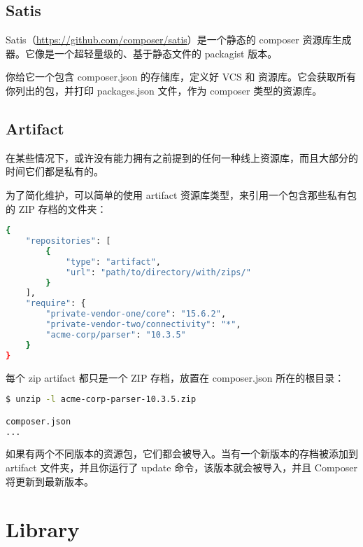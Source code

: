 \begin{lstlisting}[language=bash]

\end{lstlisting}

\subsection{Satis}

Satis（\url{https://github.com/composer/satis}）是一个静态的 composer 资源库生成器。它像是一个超轻量级的、基于静态文件的 packagist 版本。

你给它一个包含 composer.json 的存储库，定义好 VCS 和 资源库。它会获取所有你列出的包，并打印 packages.json 文件，作为 composer 类型的资源库。



\subsection{Artifact}

在某些情况下，或许没有能力拥有之前提到的任何一种线上资源库，而且大部分的时间它们都是私有的。

为了简化维护，可以简单的使用 artifact 资源库类型，来引用一个包含那些私有包的 ZIP 存档的文件夹：

\begin{lstlisting}[language=bash]
{
    "repositories": [
        {
            "type": "artifact",
            "url": "path/to/directory/with/zips/"
        }
    ],
    "require": {
        "private-vendor-one/core": "15.6.2",
        "private-vendor-two/connectivity": "*",
        "acme-corp/parser": "10.3.5"
    }
}
\end{lstlisting}

每个 zip artifact 都只是一个 ZIP 存档，放置在 composer.json 所在的根目录：


\begin{lstlisting}[language=bash]
$ unzip -l acme-corp-parser-10.3.5.zip

composer.json
...
\end{lstlisting}

如果有两个不同版本的资源包，它们都会被导入。当有一个新版本的存档被添加到 artifact 文件夹，并且你运行了 update 命令，该版本就会被导入，并且 Composer 将更新到最新版本。






\section{Library}


